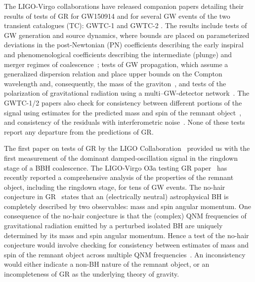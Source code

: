 The LIGO-Virgo collaborations have released companion papers detailing their results
of tests of GR for GW150914 \cite{TheLIGOScientific:2016src} and for several GW events of
the two transient catalogues (TC): GWTC-1 \cite{LIGOScientific:2018mvr,LIGOScientific:2019fpa}  and GWTC-2 \cite{Abbott:2020niy,Abbott:2020jks}.
The results include tests of GW generation and source dynamics, where bounds are placed on
parameterized deviations in the post-Newtonian (PN) coefficients describing
the early inspiral and
phenomenological coefficients describing the intermediate (plunge) and
merger regimes of coalescence~\cite{Arun:2006hn,Arun:2006yw,Agathos:2013upa,Abbott:2018lct}; tests of GW
propagation, which assume a generalized dispersion relation and place
upper bounds on the Compton wavelength and, consequently, the mass of
the graviton~\cite{Abbott:2017vtc,Samajdar:2017mka}, and tests of the
polarization of gravitational radiation using a
multi--GW-detector network~\cite{Abbott:2017oio,Isi:2017fbj}. The GWTC-1/2 papers also
check for consistency between different portions of the signal using estimates for the predicted mass and spin of the remnant
object~\cite{Ghosh:2016xx,Ghosh:2017gfp,TheLIGOScientific:2016src}, and
consistency of the residuals with interferometric
noise~\cite{Ghonge:2020suv,LIGOScientific:2019fpa}. None of these tests report any
departure from the predictions of GR.

The first paper on tests of GR by the LIGO Collaboration~\cite{TheLIGOScientific:2016src} provided us with the
first measurement of the dominant damped-oscillation signal in the ringdown stage of a BBH
coalescence. The LIGO-Virgo O3a testing GR paper~\cite{Abbott:2020jks} has recently reported a comprehensive analysis of the properties of the remnant object, including the ringdown stage, for tens of GW events.
The no-hair conjecture in GR~\cite{Carter:1971zc,Hansen:1974zz} states that an (electrically neutral) astrophysical BH is completely
described by two observables: mass and spin angular momentum. One
consequence of the no-hair conjecture is that the (complex) QNM
frequencies of gravitational radiation emitted by a perturbed isolated
BH are uniquely determined by its mass and spin angular momentum. Hence
a test of the no-hair conjecture would involve checking for
consistency between estimates of mass and spin of the remnant object
across multiple QNM frequencies~\cite{Dreyer:2003bv}. An inconsistency would either
indicate a non-BH nature of the remnant object, or an incompleteness
of GR as the underlying theory of gravity.

